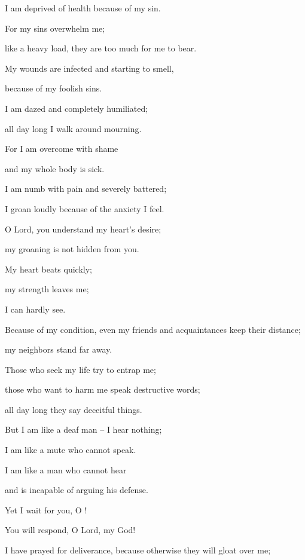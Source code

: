 {\par }{\Q I
am deprived
of health
because
of my sin.
\par }{\Q {}For
my sins
overwhelm
me;

\par }{\Q like a heavy
load,
they are too much for me to bear.
\par }{\Q {}My wounds
are infected
and starting
to smell,

\par }{\Q because
of my foolish sins.
\par }{\Q {}I am dazed
and completely humiliated;
\par }{\Q all
day
long I walk
around mourning.
\par }{\Q {}For
I am overcome
with shame
\par }{\Q and my whole body
is sick.
\par }{\Q {}I am numb with pain
and severely
battered;
\par }{\Q I groan loudly
because of the anxiety
I feel.
\par }{\Q {}O Lord,
you understand my heart’s
desire;
\par }{\Q my groaning
is not
hidden
from you.
\par }{\Q {}My heart
beats quickly;
\par }{\Q my strength
leaves
me;
\par }{\Q I can hardly
see.
\par }{\Q {}Because of my condition,
even my friends
and acquaintances
keep their distance;
\par }{\Q my neighbors stand
far away.
\par }{\Q {}Those who seek
my life
try to entrap
me;

\par }{\Q those who want
to harm
me speak
destructive
words;
\par }{\Q all
day
long they say deceitful things.
\par }{\Q {}But I am
like a deaf man – I hear nothing;
\par }{\Q I am like a mute who cannot speak.
\par }{\Q {}I am like
a man
who
cannot
hear
\par }{\Q and is incapable
of arguing
his defense.
\par }{\Q {}Yet
I wait
for
you, O
{}!
\par }{\Q You
will respond,
O Lord,
my God!
\par }{\Q {}I have prayed
for deliverance, because
otherwise
they will gloat
over me;

}
